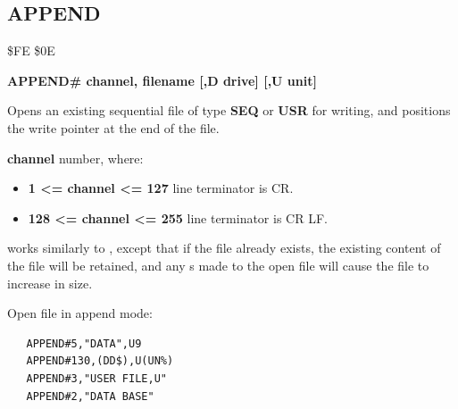 \subsection{APPEND}
\begin{description}[leftmargin=2cm,style=nextline]
\item [Token:] \$FE \$0E
\item [Format:]
  {\bf APPEND\# channel, filename [,D drive] [,U unit] }
\item [Usage:]
   Opens an existing sequential file of type
   {\bf SEQ} or {\bf USR} for writing, and positions the write pointer
   at the end of the file.

    {\bf channel} number, where:
    \begin{itemize}
        \item {\bf 1 <= channel <= 127} line terminator is CR.
        \item {\bf 128 <= channel <= 255} line terminator is CR LF.
    \end{itemize}

   \filenamedefinition

   \drivedefinition

   \unitdefinition

\item [Remarks:]
    works similarly to ,
   except that if the file already
   exists, the existing content of the file will be retained, and any
   s made to the
   open file will cause the file to increase in size.

\item [Examples:] Open file in append mode:

\begin{tcolorbox}[colback=black,coltext=white]
\verbatimfont{\codefont}
\begin{verbatim}
   APPEND#5,"DATA",U9
   APPEND#130,(DD$),U(UN%)
   APPEND#3,"USER FILE,U"
   APPEND#2,"DATA BASE"
\end{verbatim}
\end{tcolorbox}
\end{description}


\newpage
